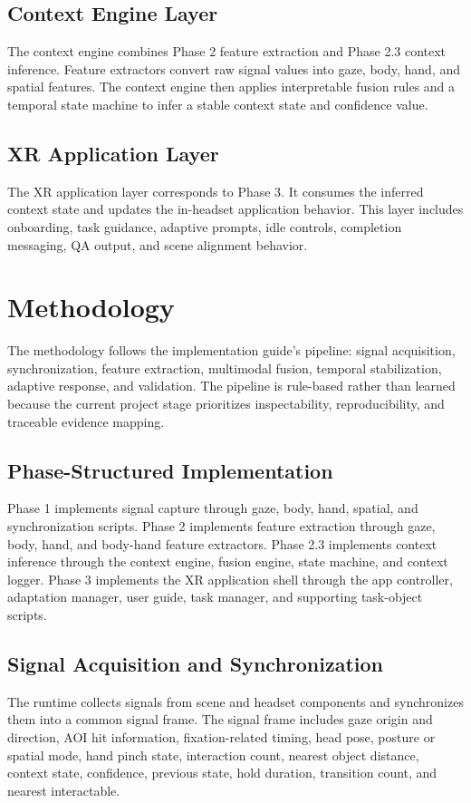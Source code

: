 \documentclass[conference]{IEEEtran}
\begin{document}
\subsection{Context Engine Layer}
The context engine combines Phase 2 feature extraction and Phase 2.3 context inference. Feature extractors convert raw signal values into gaze, body, hand, and spatial features. The context engine then applies interpretable fusion rules and a temporal state machine to infer a stable context state and confidence value.

\subsection{XR Application Layer}
The XR application layer corresponds to Phase 3. It consumes the inferred context state and updates the in-headset application behavior. This layer includes onboarding, task guidance, adaptive prompts, idle controls, completion messaging, QA output, and scene alignment behavior.

\section{Methodology}
The methodology follows the implementation guide's pipeline: signal acquisition, synchronization, feature extraction, multimodal fusion, temporal stabilization, adaptive response, and validation. The pipeline is rule-based rather than learned because the current project stage prioritizes inspectability, reproducibility, and traceable evidence mapping.

\subsection{Phase-Structured Implementation}
Phase 1 implements signal capture through gaze, body, hand, spatial, and synchronization scripts. Phase 2 implements feature extraction through gaze, body, hand, and body-hand feature extractors. Phase 2.3 implements context inference through the context engine, fusion engine, state machine, and context logger. Phase 3 implements the XR application shell through the app controller, adaptation manager, user guide, task manager, and supporting task-object scripts.

\subsection{Signal Acquisition and Synchronization}
The runtime collects signals from scene and headset components and synchronizes them into a common signal frame. The signal frame includes gaze origin and direction, AOI hit information, fixation-related timing, head pose, posture or spatial mode, hand pinch state, interaction count, nearest object distance, context state, confidence, previous state, hold duration, transition count, and nearest interactable.
\end{document}
